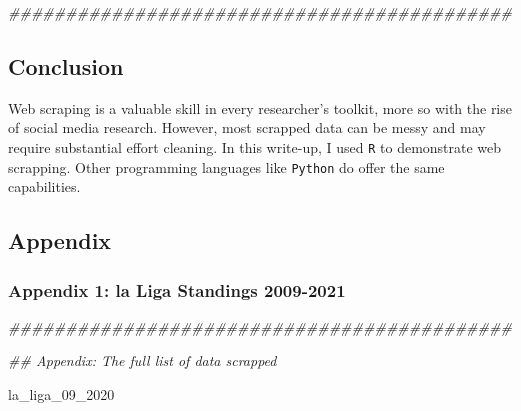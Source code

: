 \documentclass[]{tufte-handout}
\newenvironment{Shaded}{}{}
\newcommand{\DocumentationTok}[1]{\textcolor[rgb]{0.73,0.13,0.13}{\textit{#1}}}
\newcommand{\NormalTok}[1]{#1}
\begin{document}
\begin{Shaded}
\begin{Highlighting}[]
\DocumentationTok{\#\#\#\#\#\#\#\#\#\#\#\#\#\#\#\#\#\#\#\#\#\#\#\#\#\#\#\#\#\#\#\#\#\#\#\#\#\#\#\#\#\#\#\#}
\end{Highlighting}
\end{Shaded}

\hypertarget{conclusion}{%
\subsection{\texorpdfstring{\textbf{Conclusion}}{Conclusion}}\label{conclusion}}

Web scraping is a valuable skill in every researcher's toolkit, more so
with the rise of social media research. However, most scrapped data can
be messy and may require substantial effort cleaning. In this write-up,
I used \texttt{R} to demonstrate web scrapping. Other programming
languages like \texttt{Python} do offer the same capabilities.

\hypertarget{appendix}{%
\subsection{\texorpdfstring{\textbf{Appendix}}{Appendix}}\label{appendix}}

\hypertarget{appendix-1-la-liga-standings-2009-2021}{%
\subsubsection{Appendix 1: la Liga Standings
2009-2021}\label{appendix-1-la-liga-standings-2009-2021}}

\begin{Shaded}
\begin{Highlighting}[]
\DocumentationTok{\#\#\#\#\#\#\#\#\#\#\#\#\#\#\#\#\#\#\#\#\#\#\#\#\#\#\#\#\#\#\#\#\#\#\#\#\#\#\#\#\#\#\#\#}

\DocumentationTok{\#\# Appendix: The full list of data scrapped}

\NormalTok{la\_liga\_09\_2020}
\end{Highlighting}
\end{Shaded}
\end{document}
